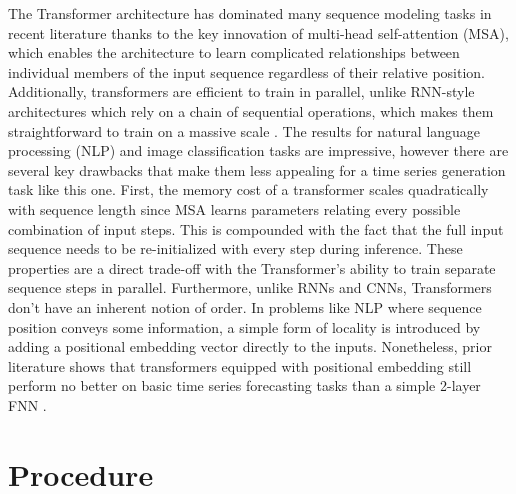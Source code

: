 \documentclass[11pt]{article}
\begin{document}
\begin{multicols}{2}
    The Transformer architecture has dominated many sequence modeling tasks in recent literature thanks to the key innovation of multi-head self-attention (MSA), which enables the architecture to learn complicated relationships between individual members of the input sequence regardless of their relative position. Additionally, transformers are efficient to train in parallel, unlike RNN-style architectures which rely on a chain of sequential operations, which makes them straightforward to train on a massive scale \cite{vaswani_attention_2017}. The results for natural language processing (NLP) \cite{devlin_bert_2019} and image classification \cite{dosovitskiy_image_2021} tasks are impressive, however there are several key drawbacks that make them less appealing for a time series generation task like this one. First, the memory cost of a transformer scales quadratically with sequence length since MSA learns parameters relating every possible combination of input steps. This is compounded with the fact that the full input sequence needs to be re-initialized with every step during inference. These properties are a direct trade-off with the Transformer's ability to train separate sequence steps in parallel. Furthermore, unlike RNNs and CNNs, Transformers don't have an inherent notion of order. In problems like NLP where sequence position conveys some information, a simple form of locality is introduced by adding a positional embedding vector directly to the inputs. Nonetheless, prior literature shows that transformers equipped with positional embedding still perform no better on basic time series forecasting tasks than a simple 2-layer FNN \cite{zeng_are_2022}.

\end{multicols}

\section{Procedure}
\end{document}

